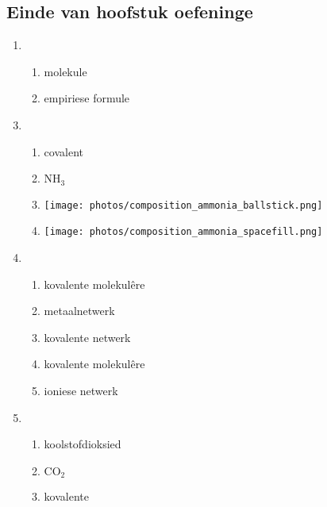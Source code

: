 \subsection{Einde van hoofstuk oefeninge} 
\begin{multicols}{3}
\begin{enumerate}[noitemsep, label=\textbf{\arabic*}. ] 
\item %
    \begin{enumerate}[noitemsep, label=\textbf{(\alph*)} ]
  \item molekule
\item empiriese formule
 \end{enumerate}
\end{enumerate}
\begin{enumerate}[noitemsep, label=\textbf{(\arabic*)} ]
\setcounter{enumi}{2}
\item %
    \begin{enumerate}[noitemsep, label=\textbf{(\alph*)} ]
 \item covalent
\item $\text{NH}_{3}$
\item \texttt{[image: photos/composition\_ammonia\_ballstick.png]}
\item \texttt{[image: photos/composition\_ammonia\_spacefill.png]}
\end{enumerate}
\item %
    \begin{enumerate}[noitemsep, label=\textbf{(\alph*)} ]
 \item kovalente molekul\^{e}re
\item metaalnetwerk
\item kovalente netwerk
\item kovalente molekul\^{e}re
\item ioniese netwerk
\end{enumerate}
\item %
    \begin{enumerate}[noitemsep, label=\textbf{(\alph*)} ]
 \item koolstofdioksied
\item $\text{CO}_2$
\item kovalente
\end{enumerate}
\end{enumerate}
\end{multicols}

